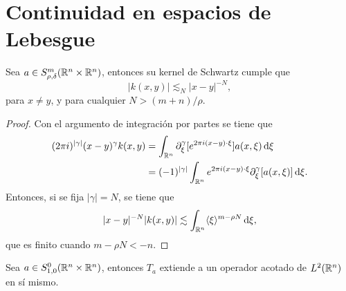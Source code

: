 \section{Continuidad en espacios de Lebesgue}
\begin{theorem}\label{theo:kernel-estimates}
	Sea $a\in S^m_{\rho,\delta}(\mathbb{R}^n\times\mathbb{R}^n)$, entonces su kernel de Schwartz cumple que 
	\begin{equation*}
		|k(x, y)| \lesssim_N |x-y|^{-N},
	\end{equation*}
	para $x\neq y$, y para cualquier $N>(m+n)/\rho$. 
\end{theorem}
\begin{proof}
	Con el argumento de integración por partes se tiene que 
	\begin{align*}
		(2\pi i)^{|\gamma|} (x-y)^\gamma k(x, y) & = 
		\int_{\mathbb{R}^n} \partial^\gamma_\xi [e^{2\pi i (x-y)\cdot\xi}]a(x, \xi) \mathop{}\!\mathrm{d} \xi \\
		& = (-1)^{|\gamma|} \int_{\mathbb{R}^n} e^{2\pi i (x-y)\cdot\xi} \partial^\gamma_\xi [a(x, \xi)] \mathop{}\!\mathrm{d} \xi.
	\end{align*}
	Entonces, si se fija $|\gamma|=N$, se tiene que 
	\begin{equation*}
		|x-y|^{-N}|k(x, y)| \lesssim \int_{\mathbb{R}^n} \langle\xi\rangle^{m-\rho N} \mathop{}\!\mathrm{d} \xi,
	\end{equation*}
	que es finito cuando $m-\rho N < -n$.
\end{proof}
\begin{theorem}\label{theo:L2-boundedness-S0}
	Sea $a\in S^0_{1,0}(\mathbb{R}^n\times\mathbb{R}^n)$, entonces $T_a$ extiende a un operador acotado de $L^2(\mathbb{R}^n)$ en sí mismo.
\end{theorem}
